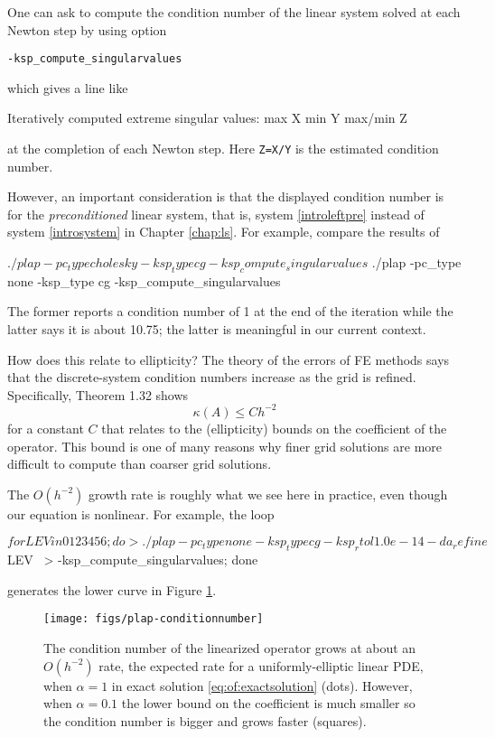 One can ask \PETSc to compute the condition number of the linear system solved at each Newton step by using option

\centerline{\texttt{-ksp\_compute\_singularvalues}}

\noindent which gives a line like
\begin{code}
Iteratively computed extreme singular values: max X min Y max/min Z
\end{code}
at the completion of each Newton step.  Here \texttt{Z=X/Y} is the estimated condition number.

However, an important consideration is that the displayed condition number is for the \emph{preconditioned} linear system, that is, system \eqref{introleftpre} instead of system \eqref{introsystem} in Chapter \ref{chap:ls}.  For example, compare the results of
\begin{cline}
$ ./plap -pc_type cholesky -ksp_type cg -ksp_compute_singularvalues
$ ./plap -pc_type none -ksp_type cg -ksp_compute_singularvalues
\end{cline}
The former reports a condition number of 1 at the end of the iteration while the latter says it is about 10.75; the latter is meaningful in our current context.

How does this relate to ellipticity?  The theory of the errors of FE methods says that the discrete-system condition numbers increase as the grid is refined.  Specifically,  \citet{Elmanetal2005} Theorem 1.32 shows
    $$\kappa(A) \le C h^{-2}$$
for a constant $C$ that relates to the (ellipticity) bounds on the coefficient of the operator.  This bound is one of many reasons why finer grid solutions are more difficult to compute than coarser grid solutions.

The $O(h^{-2})$ growth rate is roughly what we see here in practice, even though our equation is nonlinear.  For example, the loop
\begin{cline}
$ for LEV in 0 1 2 3 4 5 6; do
>   ./plap -pc_type none -ksp_type cg -ksp_rtol 1.0e-14 -da_refine $LEV \
>      -ksp_compute_singularvalues; done
\end{cline}
generates the lower curve in Figure \ref{fig:of:plap-conditionnumber}.

\begin{figure}
\texttt{[image: figs/plap-conditionnumber]}
\caption{The condition number of the linearized operator grows at about an $O(h^{-2})$ rate, the expected rate for a uniformly-elliptic linear PDE, when $\alpha=1$ in exact solution \eqref{eq:of:exactsolution} (dots).  However, when $\alpha=0.1$ the lower bound on the coefficient is much smaller so the condition number is bigger and grows faster (squares).}
\label{fig:of:plap-conditionnumber}
\end{figure}

